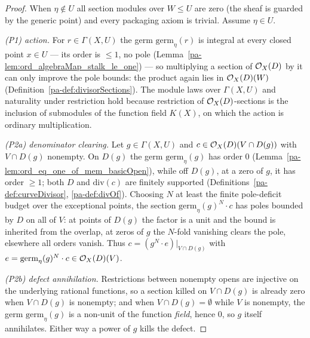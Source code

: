 \begin{proof}
  \leanok
  When \(\eta \notin U\) all section modules over \(W \le U\) are zero (the sheaf is guarded by the
  generic point) and every packaging axiom is trivial. Assume \(\eta \in U\).

  \emph{(P1) action.} For \(r \in \Gamma(X, U)\) the germ \(\mathrm{germ}_\eta(r)\) is integral at
  every closed point \(x \in U\) --- its order is \(\le 1\), no pole (Lemma~\ref{pa-lem:ord_algebraMap_stalk_le_one})
  --- so multiplying a section of \(\mathcal{O}_{X}(D)\) by it can only improve the pole bounds: the
  product again lies in \(\mathcal{O}_{X}(D)(W)\) (Definition~\ref{pa-def:divisorSections}). The module laws
  over \(\Gamma(X, U)\) and naturality under restriction hold because restriction of \(\mathcal{O}_{X}(D)\)-sections is the inclusion of submodules of the function field \(K(X)\), on which the action
  is ordinary multiplication.

  \emph{(P2a) denominator clearing.} Let \(g \in \Gamma(X, U)\) and \(c \in \mathcal{O}_{X}(D)(V \cap
  D(g))\) with \(V \cap D(g)\) nonempty. On \(D(g)\) the germ \(\mathrm{germ}_\eta(g)\) has order
  \(0\) (Lemma~\ref{pa-lem:ord_eq_one_of_mem_basicOpen}), while off \(D(g)\), at a zero of \(g\), it
  has order \(\ge 1\); both \(D\) and \(\mathrm{div}(c)\) are finitely supported
  (Definitions~\ref{pa-def:curveDivisor}, \ref{pa-def:divOf}). Choosing \(N\) at least the finite
  pole-deficit budget over the exceptional points, the section \(\mathrm{germ}_\eta(g)^N \cdot c\)
  has poles bounded by \(D\) on all of \(V\): at points of \(D(g)\) the factor is a unit and the
  bound is inherited from the overlap, at zeros of \(g\) the \(N\)-fold vanishing clears the pole,
  elsewhere all orders vanish. Thus \(c = (g^N \cdot e)|_{V \cap D(g)}\) with \(e =
  \mathrm{germ}_\eta(g)^N \cdot c \in \mathcal{O}_{X}(D)(V)\).

  \emph{(P2b) defect annihilation.} Restrictions between nonempty opens are injective on the
  underlying rational functions, so a section killed on \(V \cap D(g)\) is already zero when \(V
  \cap D(g)\) is nonempty; and when \(V \cap D(g) = \emptyset\) while \(V\) is nonempty, the germ
  \(\mathrm{germ}_\eta(g)\) is a non-unit of the function \emph{field}, hence \(0\), so \(g\) itself
  annihilates. Either way a power of \(g\) kills the defect.
\end{proof}


